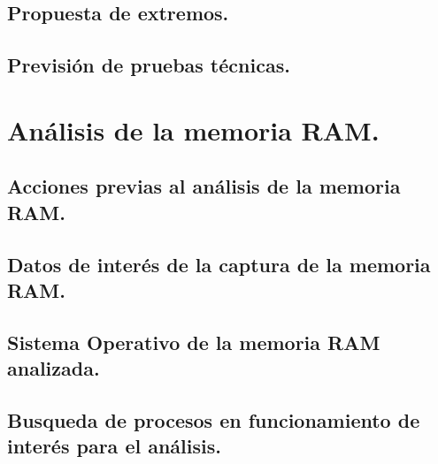 \documentclass[12pt,a4paper]{report}
\begin{document}
\section{Propuesta de extremos.}

\clearpage

\section{Previsión de pruebas técnicas.}

\clearpage

\chapter{Análisis de la memoria RAM.}

\clearpage

\section{Acciones previas al análisis de la memoria RAM.}

\clearpage

\section{Datos de interés de la captura de la memoria RAM.}

\clearpage

\section{Sistema Operativo de la memoria RAM analizada.}

\clearpage

\section{Busqueda de procesos en funcionamiento de interés para el análisis.}

\clearpage
\end{document}
